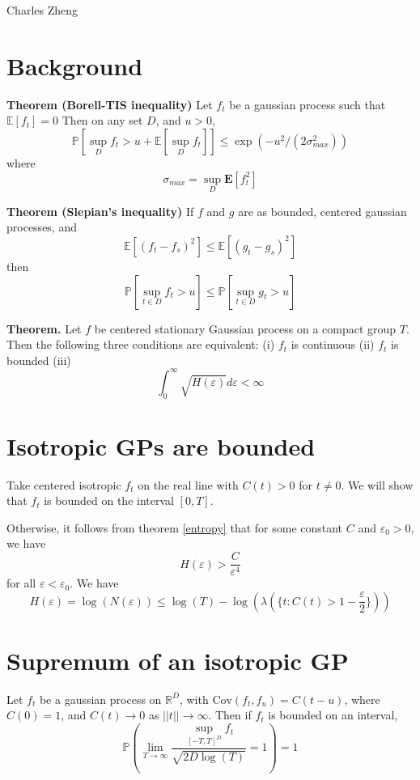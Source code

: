 \documentclass[11pt]{article}
\begin{document}
\newcommand{\tr}{\text{tr}}
\newcommand{\E}{\textbf{E}}
\newcommand{\diag}{\text{diag}}
\newcommand{\argmax}{\text{argmax}}
\newcommand{\Cov}{\text{Cov}}

Charles Zheng

\section{Background}

\noindent\textbf{Theorem (Borell-TIS inequality)}
Let $f_t$ be a gaussian process such that $\mathbb{E}[f_t] = 0$
Then on any set $D$, and $u > 0$, 
\[
\mathbb{P}[\sup_D f_t > u + \mathbb{E}[\sup_D f_t]] \leq \exp(-u^2/(2\sigma_{max}^2))
\]
where
\[
\sigma_{max} = \sup_D \E[f_t^2]
\]

\noindent\textbf{Theorem (Slepian's inequality)}
If $f$ and $g$ are as bounded, centered gaussian processes, and
\[
\mathbb{E}[(f_t-f_s)^2] \leq \mathbb{E}[(g_t-g_s)^2]
\]
then
\[
\mathbb{P}[\sup_{t \in D} f_t  > u] \leq \mathbb{P}[\sup_{t \in D} g_t  > u]
\]

\noindent\textbf{Theorem.}\label{entropy} Let $f$ be centered stationary Gaussian
process on a compact group $T$. Then the following three conditions
are equivalent: (i) $f_t$ is continuous (ii) $f_t$ is bounded (iii)
\[
\int_0^\infty \sqrt{H(\varepsilon)} d\varepsilon < \infty 
\]

\section{Isotropic GPs are bounded}

Take centered isotropic $f_t$ on the real line with $C(t) > 0$ for $t
\neq 0$.  We will show that $f_t$ is bounded on the interval $[0,T]$.

Otherwise, it follows from theorem \ref{entropy} that 
for some constant $C$ and $\varepsilon_0 > 0$, we have
\[
H(\varepsilon) > \frac{C}{\varepsilon^4}
\]
for all $\varepsilon < \varepsilon_0$.
We have
\[
H(\varepsilon) = \log(N(\varepsilon)) \leq \log(T) - \log(\lambda(\{t:
C(t) > 1-\frac{\varepsilon}{2}\}))
\]

\section{Supremum of an isotropic GP}

Let $f_t$ be a gaussian process on $\mathbb{R}^D$, with $\Cov(f_t,f_u)
= C(t-u)$, where $C(0) = 1$, and $C(t) \to 0$ as $||t|| \to \infty$.
Then if $f_t$ is bounded on an interval,
\[
\mathbb{P}\left(\lim_{T \to \infty}\frac{\sup_{[-T,T]^D}
    f_t}{\sqrt{2D\log(T)}} = 1
\right) = 1
\]
\end{document}
